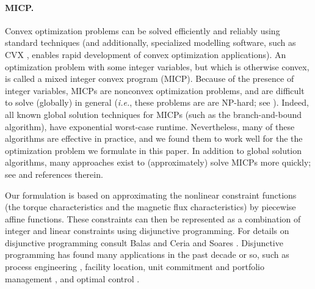 \documentclass[11pt]{article}
\newcommand{\ie}{{\it i.e.}}
\begin{document}
\paragraph{MICP.}
Convex optimization problems can be solved efficiently and reliably using standard techniques 
\cite{boyd2004convex}
(and additionally, specialized modelling software,
such as CVX \cite{cvx},  enables rapid development of convex optimization applications).
An optimization problem with some integer variables,
but which is otherwise convex, is called a mixed integer convex program (MICP).
Because of the presence of integer variables,
MICPs are nonconvex optimization problems, 
and are difficult to solve (globally) in general
(\ie, these problems are are NP-hard; see
\cite{kleinberg2006algorithm}).
Indeed, all known global solution techniques for MICPs
(such as the branch-and-bound algorithm),
have exponential worst-case runtime.
Nevertheless, many of these algorithms are effective in practice,
and we found them to work well 
for the the optimization problem we formulate in this paper.
In addition to global solution algorithms,
many approaches exist to (approximately) solve MICPs
more quickly;
see \cite{takapoui2015simple}  and references therein.

Our formulation is based on approximating the nonlinear constraint functions
(the torque characteristics and the magnetic flux characteristics)
by piecewise affine functions.
These constraints can then be represented as a combination
of integer and linear constraints using disjunctive programming.
For details on disjunctive programming consult
Balas \cite{balas1979disjunctive} and Ceria and Soares \cite{ceria1999convex}.
Disjunctive programming has found many applications in the past decade or so,
such as process engineering \cite{grossmann2013systematic},
facility location, unit commitment and portfolio management \cite{gunluk2012perspective},
and optimal control \cite{moehle2015perspective}.
\end{document}
